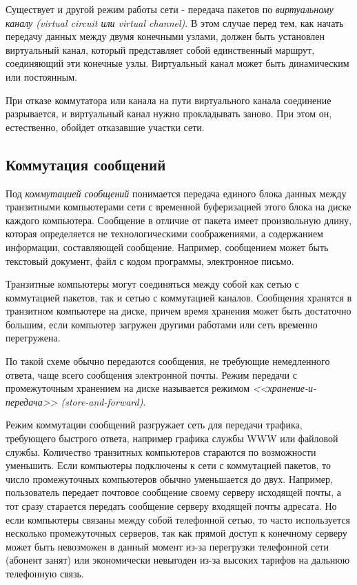 Существует и другой режим работы сети - передача пакетов по \emph{виртуальному каналу (virtual circuit или virtual channel)}.
В этом случае перед тем, как начать передачу данных между двумя конечными узлами, должен быть установлен виртуальный канал, который представляет собой единственный маршрут, соединяющий эти конечные узлы.
Виртуальный канал может быть динамическим или постоянным.

При отказе коммутатора или канала на пути виртуального канала соединение разрывается, и виртуальный канал нужно прокладывать заново.
При этом он, естественно, обойдет отказавшие участки сети.

\subsection{Коммутация сообщений}

Под \emph{коммутацией сообщений} понимается передача единого блока данных между транзитными компьютерами сети с временной буферизацией этого блока на диске каждого компьютера.
Сообщение в отличие от пакета имеет произвольную длину, которая определяется не технологическими соображениями, а содержанием информации, составляющей сообщение.
Например, сообщением может быть текстовый документ, файл с кодом программы, электронное письмо.

Транзитные компьютеры могут соединяться между собой как сетью с коммутацией пакетов, так и сетью с коммутацией каналов.
Сообщения хранятся в транзитном компьютере на диске, причем время хранения может быть достаточно большим, если компьютер загружен другими работами или сеть временно перегружена.

По такой схеме обычно передаются сообщения, не требующие немедленного ответа, чаще всего сообщения электронной почты.
Режим передачи с промежуточным хранением на диске называется режимом \emph{<<хранение-и-передача>> (store-and-forward)}.

Режим коммутации сообщений разгружает сеть для передачи трафика, требующего быстрого ответа, например графика службы WWW или файловой службы.
Количество транзитных компьютеров стараются по возможности уменьшить.
Если компьютеры подключены к сети с коммутацией пакетов, то число промежуточных компьютеров обычно уменьшается до двух.
Например, пользователь передает почтовое сообщение своему серверу исходящей почты, а тот сразу старается передать сообщение серверу входящей почты адресата.
Но если компьютеры связаны между собой телефонной сетью, то часто используется несколько промежуточных серверов, так как прямой доступ к конечному серверу может быть невозможен в данный момент из-за перегрузки телефонной сети (абонент занят) или экономически невыгоден из-за высоких тарифов на дальнюю телефонную связь.

